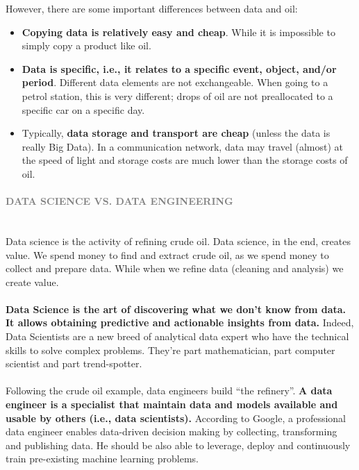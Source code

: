\documentclass[10pt,a4paper]{article}
\newcommand{\nline}{\\~\\}
\newcommand{\myparagraph}[1]{\paragraph{\normalsize{\textcolor{gray}{\uppercase{\textbf{#1}}}} }\mbox{} \vspace{0.5em}\\}
\begin{document}
\pagebreak However, there are some important differences between data and oil:
\begin{itemize}
	\item \textbf{Copying data is relatively easy and cheap}. While it is impossible to simply copy a product like oil.
	\item \textbf{Data is specific, i.e., it relates to a specific event, object, and/or period}. Different data elements are not exchangeable. When going to a petrol station, this is very different; drops of oil are not preallocated to a specific car on a specific day.
	\item Typically, \textbf{data storage and transport are cheap} (unless the data is really Big Data). In a communication network, data may travel (almost) at the speed of light and storage costs are much lower than the storage costs of oil.
\end{itemize}
\myparagraph{Data Science vs. Data Engineering}
Data science is the activity of refining crude oil. Data science, in the end, creates value. We spend money to find and extract crude oil, as we spend money to collect and prepare data. While when we refine data (cleaning and analysis) we create value.
\nline
\textbf{Data Science is the art of discovering what we don’t know from data. It allows obtaining predictive and actionable insights from data.} Indeed, Data Scientists are a new breed of analytical data expert who have the technical skills to solve complex problems. They’re part mathematician, part computer scientist and part trend-spotter. 
\nline
Following the crude oil example, data engineers build “the refinery”. \textbf{A data engineer is a specialist that maintain data and models available and usable by others (i.e., data scientists).} According to Google, a professional data engineer enables data-driven decision making by collecting, transforming and publishing data. He should be also able to leverage, deploy and continuously train pre-existing machine learning problems.
\end{document}
